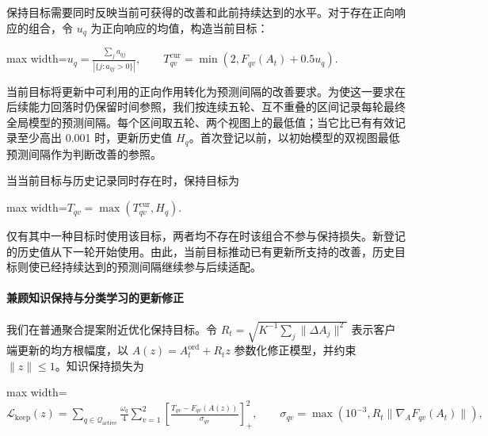 \documentclass[UTF8,a4paper,10pt,fontset=fandol]{ctexart}
\begin{document}
保持目标需要同时反映当前可获得的改善和此前持续达到的水平。对于存在正向响应的组合，令 $u_q$ 为正向响应的均值，构造当前目标：


\begin{center}\begin{adjustbox}{max width=\linewidth}$\displaystyle u_q=\frac{\sum_j a_{qj}}{|\{j:a_{qj}>0\}|},
\qquad
T_{qv}^{\mathrm{cur}}=\min\left(2,F_{qv}(A_t)+0.5u_q\right).$\end{adjustbox}\end{center}

当前目标将更新中可利用的正向作用转化为预测间隔的改善要求。为使这一要求在后续能力回落时仍保留时间参照，我们按连续五轮、互不重叠的区间记录每轮最终全局模型的预测间隔。每个区间取五轮、两个视图上的最低值；当它比已有有效记录至少高出 0.001 时，更新历史值 $H_q$。首次登记以前，以初始模型的双视图最低预测间隔作为判断改善的参照。


当当前目标与历史记录同时存在时，保持目标为


\begin{center}\begin{adjustbox}{max width=\linewidth}$\displaystyle T_{qv}=\max\left(T_{qv}^{\mathrm{cur}},H_q\right).$\end{adjustbox}\end{center}

仅有其中一种目标时使用该目标，两者均不存在时该组合不参与保持损失。新登记的历史值从下一轮开始使用。由此，当前目标推动已有更新所支持的改善，历史目标则使已经持续达到的预测间隔继续参与后续适配。


\paragraph{兼顾知识保持与分类学习的更新修正}

我们在普通聚合提案附近优化保持目标。令 $R_t=\sqrt{K^{-1}\sum_j\|\Delta A_j\|^2}$ 表示客户端更新的均方根幅度，以 $A(z)=A_t^{\mathrm{ord}}+R_tz$ 参数化修正模型，并约束 $\|z\|\leq1$。知识保持损失为


\begin{center}\begin{adjustbox}{max width=\linewidth}$\displaystyle \mathcal L_{\mathrm{keep}}(z)
=\sum_{q\in\mathcal Q_{\mathrm{active}}}
\frac{\omega_q}{4}\sum_{v=1}^{2}
\left[\frac{T_{qv}-F_{qv}(A(z))}{\sigma_{qv}}\right]_+^2,
\qquad
\sigma_{qv}=\max\left(10^{-3},R_t\|\nabla_A F_{qv}(A_t)\|\right),$\end{adjustbox}\end{center}
\end{document}
